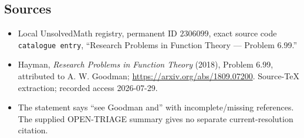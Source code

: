 \documentclass[11pt]{article}
\begin{document}
\subsection{Sources}
\begin{itemize}
\item Local UnsolvedMath registry, permanent ID \(2306099\), exact source code \texttt{catalogue entry}, ``Research Problems in Function Theory --- Problem 6.99.''
\item Hayman, \emph{Research Problems in Function Theory} (2018), Problem 6.99, attributed to A. W. Goodman; \url{https://arxiv.org/abs/1809.07200}. Source-TeX extraction; recorded access 2026-07-29.
\item The statement says ``see Goodman and'' with incomplete/missing references. The supplied OPEN-TRIAGE summary gives no separate current-resolution citation.
\end{itemize}
\end{document}

